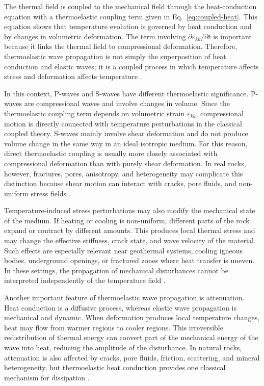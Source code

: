 The thermal field is coupled to the mechanical field through the heat-conduction equation with a thermoelastic coupling term given in Eq.~\eqref{eq:coupled-heat}. This equation shows that temperature evolution is governed by heat conduction and by changes in volumetric deformation. The term involving \(\partial \varepsilon_{kk}/\partial t\) is important because it links the thermal field to compressional deformation. Therefore, thermoelastic wave propagation is not simply the superposition of heat conduction and elastic waves; it is a coupled process in which temperature affects stress and deformation affects temperature \cite{nowacki1986,boley1960}.

In this context, P-waves and S-waves have different thermoelastic significance. P-waves are compressional waves and involve changes in volume. Since the thermoelastic coupling term depends on volumetric strain \(\varepsilon_{kk}\), compressional motion is directly connected with temperature perturbations in the classical coupled theory. S-waves mainly involve shear deformation and do not produce volume change in the same way in an ideal isotropic medium. For this reason, direct thermoelastic coupling is usually more closely associated with compressional deformation than with purely shear deformation. In real rocks, however, fractures, pores, anisotropy, and heterogeneity may complicate this distinction because shear motion can interact with cracks, pore fluids, and non-uniform stress fields \cite{aki2002,mavko2009,jaeger2007}.

Temperature-induced stress perturbations may also modify the mechanical state of the medium. If heating or cooling is non-uniform, different parts of the rock expand or contract by different amounts. This produces local thermal stress and may change the effective stiffness, crack state, and wave velocity of the material. Such effects are especially relevant near geothermal systems, cooling igneous bodies, underground openings, or fractured zones where heat transfer is uneven. In these settings, the propagation of mechanical disturbances cannot be interpreted independently of the temperature field \cite{robertson1988,turcotte2014,jaeger2007}.

Another important feature of thermoelastic wave propagation is attenuation. Heat conduction is a diffusive process, whereas elastic wave propagation is mechanical and dynamic. When deformation produces local temperature changes, heat may flow from warmer regions to cooler regions. This irreversible redistribution of thermal energy can convert part of the mechanical energy of the wave into heat, reducing the amplitude of the disturbance. In natural rocks, attenuation is also affected by cracks, pore fluids, friction, scattering, and mineral heterogeneity, but thermoelastic heat conduction provides one classical mechanism for dissipation \cite{boley1960,nowacki1986,mavko2009}.

